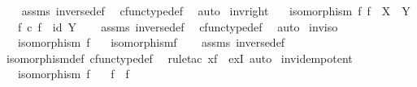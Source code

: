 \begin{isabellebody}
%
\isadelimproof
\ \ %
\endisadelimproof
%
\isatagproof
{}\isamarkupfalse%
\ assms\ inverse{\isacharunderscore}{\kern0pt}def{}\ \isamarkupfalse%
\ cfunc{\isacharunderscore}{\kern0pt}type{\isacharunderscore}{\kern0pt}def\ \isamarkupfalse%
\ auto%
\endisatagproof
{\isafoldproof}%
%
\isadelimproof
\isanewline
%
\endisadelimproof
\isanewline
{}\isamarkupfalse%
\ inv{\isacharunderscore}{\kern0pt}right{\isacharcolon}{\kern0pt}\isanewline
\ \ \ {\isachardoublequoteopen}isomorphism\ f{\isachardoublequoteclose}\ {\isachardoublequoteopen}f\ {\isacharcolon}{\kern0pt}\ X\ {\isasymrightarrow}\ Y{\isachardoublequoteclose}\isanewline
\ \ \ {\isachardoublequoteopen}f\ {\isasymcirc}\isactrlsub c\ f\isactrlbold {\isasyminverse}\ {\isacharequal}{\kern0pt}\ id\ Y{\isachardoublequoteclose}\isanewline
%
\isadelimproof
\ \ %
\endisadelimproof
%
\isatagproof
{}\isamarkupfalse%
\ assms\ inverse{\isacharunderscore}{\kern0pt}def{}\ \isamarkupfalse%
\ cfunc{\isacharunderscore}{\kern0pt}type{\isacharunderscore}{\kern0pt}def\ \isamarkupfalse%
\ auto%
\endisatagproof
{\isafoldproof}%
%
\isadelimproof
\isanewline
%
\endisadelimproof
\isanewline
{}\isamarkupfalse%
\ inv{\isacharunderscore}{\kern0pt}iso{\isacharcolon}{\kern0pt}\isanewline
\ \ \ {\isachardoublequoteopen}isomorphism\ f{\isachardoublequoteclose}\isanewline
\ \ \ {\isachardoublequoteopen}isomorphism{\isacharparenleft}{\kern0pt}f\isactrlbold {\isasyminverse}{\isacharparenright}{\kern0pt}{\isachardoublequoteclose}\isanewline
%
\isadelimproof
\ \ %
\endisadelimproof
%
\isatagproof
{}\isamarkupfalse%
\ assms\ inverse{\isacharunderscore}{\kern0pt}def{}\ \isamarkupfalse%
\ isomorphism{\isacharunderscore}{\kern0pt}def\ cfunc{\isacharunderscore}{\kern0pt}type{\isacharunderscore}{\kern0pt}def\ \isamarkupfalse%
\ {\isacharparenleft}{\kern0pt}rule{\isacharunderscore}{\kern0pt}tac\ x{\isacharequal}{\kern0pt}f\ \ exI{\isacharcomma}{\kern0pt}\ auto{\isacharparenright}{\kern0pt}%
\endisatagproof
{\isafoldproof}%
%
\isadelimproof
\isanewline
%
\endisadelimproof
\isanewline
{}\isamarkupfalse%
\ inv{\isacharunderscore}{\kern0pt}idempotent{\isacharcolon}{\kern0pt}\isanewline
\ \ \ {\isachardoublequoteopen}isomorphism\ f{\isachardoublequoteclose}\isanewline
\ \ \ {\isachardoublequoteopen}{\isacharparenleft}{\kern0pt}f\isactrlbold {\isasyminverse}{\isacharparenright}{\kern0pt}\isactrlbold {\isasyminverse}\ {\isacharequal}{\kern0pt}\ f{\isachardoublequoteclose}\isanewline

\end{isabellebody}
